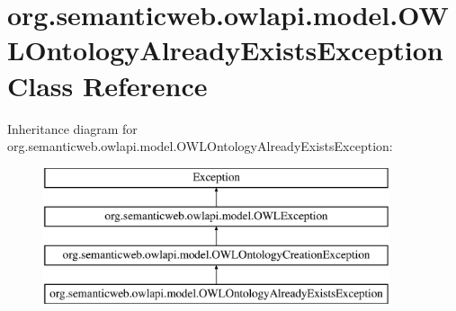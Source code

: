 \hypertarget{classorg_1_1semanticweb_1_1owlapi_1_1model_1_1_o_w_l_ontology_already_exists_exception}{\section{org.\-semanticweb.\-owlapi.\-model.\-O\-W\-L\-Ontology\-Already\-Exists\-Exception Class Reference}
\label{classorg_1_1semanticweb_1_1owlapi_1_1model_1_1_o_w_l_ontology_already_exists_exception}
}
Inheritance diagram for org.\-semanticweb.\-owlapi.\-model.\-O\-W\-L\-Ontology\-Already\-Exists\-Exception\-:\begin{figure}[H]
\begin{center}
\leavevmode
\includegraphics[height=4.000000cm]{classorg_1_1semanticweb_1_1owlapi_1_1model_1_1_o_w_l_ontology_already_exists_exception}
\end{center}
\end{figure}
